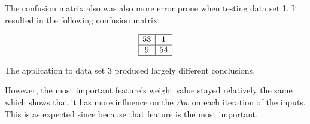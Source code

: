 \begin{enumerate}
		The confusion matrix also was also more error prone when testing data set 1.  It resulted in the following confusion matrix:
		
		\[
			\begin{array}{|c|c|}
				\hline
					53 & 1 \\
					\hline
					9 & 54 \\
				\hline
			\end{array}
		\]
			
		The application to data set 3 produced largely different conclusions.
		
		However, the most important feature's weight value stayed relatively the same which shows that it has more influence on the \(\Delta w\) on each iteration of the inputs.   This is as expected since because that feature is the most important.\\

\end{enumerate}


